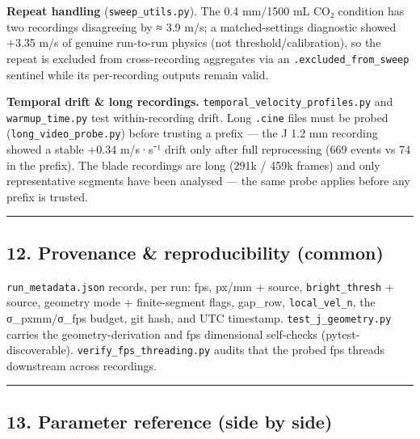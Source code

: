 \documentclass[
  11pt,
]{article}
\begin{document}
\textbf{Repeat handling} (\texttt{sweep\_utils.py}). The 0.4 mm/1500 mL
CO₂ condition has two recordings disagreeing by ≈ 3.9 m/s; a
matched-settings diagnostic showed +3.35 m/s of genuine run-to-run
physics (not threshold/calibration), so the repeat is excluded from
cross-recording aggregates via an \texttt{.excluded\_from\_sweep}
sentinel while its per-recording outputs remain valid.

\textbf{Temporal drift \& long recordings.}
\texttt{temporal\_velocity\_profiles.py} and \texttt{warmup\_time.py}
test within-recording drift. Long \texttt{.cine} files must be probed
(\texttt{long\_video\_probe.py}) before trusting a prefix --- the J 1.2
mm recording showed a stable +0.34 m/s·s⁻¹ drift only after full
reprocessing (669 events vs 74 in the prefix). The blade recordings are
long (291k / 459k frames) and only representative segments have been
analysed --- the same probe applies before any prefix is trusted.

\begin{center}\rule{0.5\linewidth}{0.5pt}\end{center}

\hypertarget{12-provenance--reproducibility-common}{%
\subsection{12. Provenance \& reproducibility
(common)}\label{12-provenance--reproducibility-common}}

\texttt{run\_metadata.json} records, per run: fps, px/mm + source,
\texttt{bright\_thresh} + source, geometry mode + finite-segment flags,
gap\_row, \texttt{local\_vel\_n}, the σ\_pxmm/σ\_fps budget, git hash,
and UTC timestamp. \texttt{test\_j\_geometry.py} carries the
geometry-derivation and fps dimensional self-checks
(pytest-discoverable). \texttt{verify\_fps\_threading.py} audits that
the probed fps threads downstream across recordings.

\begin{center}\rule{0.5\linewidth}{0.5pt}\end{center}

\hypertarget{13-parameter-reference-side-by-side}{%
\subsection{13. Parameter reference (side by
side)}\label{13-parameter-reference-side-by-side}}
\end{document}

